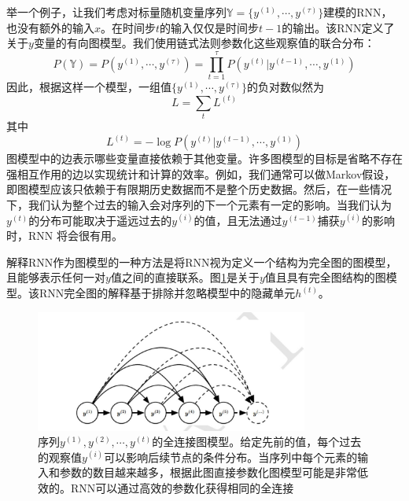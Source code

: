 \documentclass{ctexart}
\begin{document}
            举一个例子，让我们考虑对标量随机变量序列$\mathbb{Y}=\{y^{(1)},\cdots,y^{(\tau)}\}$建模的RNN，也没有额外的输入$x$。在时间步$t$的输入仅仅是时间步$t-1$的输出。该RNN定义了关于$y$变量的有向图模型。我们使用链式法则参数化这些观察值的联合分布：
            \begin{equation}
                P(\mathbb{Y}) = P(y^{(1)},\cdots,y^{(\tau)}) = \prod_{t=1}^{\tau} P(y^{(t)}|y^{(t-1)},\cdots,y^{(1)})
                \label{e10.31}
            \end{equation}
            因此，根据这样一个模型，一组值$\{y^{(1)},\cdots,y^{(\tau)}\}$的负对数似然为
            \begin{equation}
                L = \sum_t L^{(t)}
                \label{e10.32}
            \end{equation}
            其中
            \begin{equation}
                L^{(t)} = -\log P(y^{(t)}|y^{(t-1)},\cdots,y^{(1)})
                \label{e10.33}
            \end{equation}
            图模型中的边表示哪些变量直接依赖于其他变量。许多图模型的目标是省略不存在强相互作用的边以实现统计和计算的效率。例如，我们通常可以做Markov假设，即图模型应该只依赖于有限期历史数据而不是整个历史数据。然后，在一些情况下，我们认为整个过去的输入会对序列的下一个元素有一定的影响。当我们认为$y^{(t)}$的分布可能取决于遥远过去的$y^{(i)}$的值，且无法通过$y^{(t-1)}$捕获$y^{(i)}$的影响时，RNN 将会很有用。

            解释RNN作为图模型的一种方法是将RNN视为定义一个结构为完全图的图模型，且能够表示任何一对$y$值之间的直接联系。图\ref{f10.7}是关于$y$值且具有完全图结构的图模型。该RNN完全图的解释基于排除并忽略模型中的隐藏单元$h^{(t)}$。
            \begin{figure}[h]
                \centering
                \includegraphics[width=0.8\textwidth]{f7}
                \caption{序列$y^{(1)},y^{(2)},\cdots,y^{(t)}$的全连接图模型。给定先前的值，每个过去的观察值$y^{(i)}$可以影响后续节点的条件分布。当序列中每个元素的输入和参数的数目越来越多，根据此图直接参数化图模型可能是非常低效的。RNN可以通过高效的参数化获得相同的全连接}
                \label{f10.7}
            \end{figure}
\end{document}
